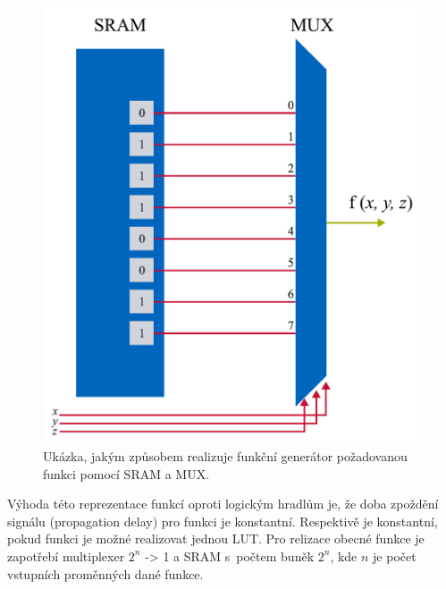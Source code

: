 \documentclass[a4paper, twoside, 11pt]{article}
\begin{document}
	\begin{minipage}[t]{0.45\textwidth}
		\begin{figure}[H]
			\centering
				\includegraphics[width=1\textwidth]{src/pdf/fpga-function-generator.pdf} 
				\caption{Ukázka, jakým způsobem realizuje funkční generátor požadovanou funkci pomocí SRAM a MUX.}
				\label{fig:fpga-function-generator}
		\end{figure}
	\end{minipage}

	\vspace*{0.5cm}
	Výhoda této reprezentace funkcí oproti logickým hradlům je, že doba zpoždění signálu (propagation delay) pro funkci je konstantní. Respektivě je konstantní, pokud funkci je možné realizovat jednou LUT. Pro relizace obecné funkce je zapotřebí multiplexer $2^{n}$ -> 1 a SRAM s~počtem buněk $2^{n}$, kde $n$ je počet vstupních proměnných dané funkce. \cite{Sass2010}
\end{document}
